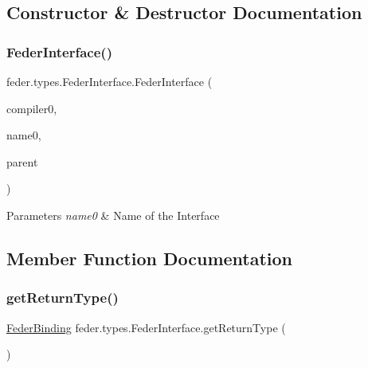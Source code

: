 \subsection{Constructor \& Destructor Documentation}
\mbox{\label{classfeder_1_1types_1_1FederInterface_abf8041a965038ca41879cecb74978b23}} 
\subsubsection{\texorpdfstring{Feder\+Interface()}{FederInterface()}}
{\footnotesize\ttfamily feder.\+types.\+Feder\+Interface.\+Feder\+Interface (\begin{DoxyParamCaption}\item[{\hyperlink{classfeder_1_1FederCompiler}{Feder\+Compiler}}]{compiler0,  }\item[{String}]{name0,  }\item[{\hyperlink{classfeder_1_1types_1_1FederBody}{Feder\+Body}}]{parent }\end{DoxyParamCaption})}


\begin{DoxyParams}{Parameters}
{\em name0} & Name of the Interface \\
\hline
\end{DoxyParams}


\subsection{Member Function Documentation}
\mbox{\label{classfeder_1_1types_1_1FederInterface_a3fecf39c73125eeaf51a33ddfbdc9f91}} 
\subsubsection{\texorpdfstring{get\+Return\+Type()}{getReturnType()}}
{\footnotesize\ttfamily \hyperlink{classfeder_1_1types_1_1FederBinding}{Feder\+Binding} feder.\+types.\+Feder\+Interface.\+get\+Return\+Type (\begin{DoxyParamCaption}{ }\end{DoxyParamCaption})}

